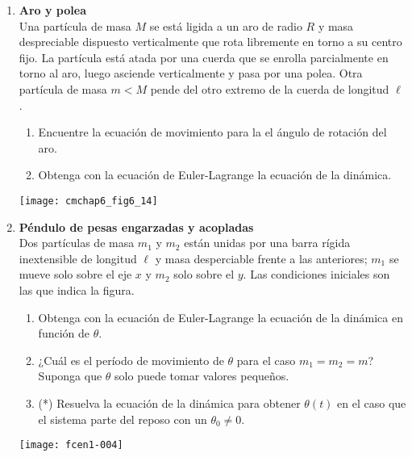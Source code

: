 \documentclass[11pt, spanish, a4paper, twoside]{article}
\begin{document}
\begin{enumerate}
\item 
\begin{minipage}[t][5cm]{0.72\textwidth}
\textbf{Aro y polea}\\
	Una partícula de masa \(M\) se está ligida a un aro de radio \(R\) y masa despreciable dispuesto verticalmente que rota libremente en torno a su centro fijo.
	La partícula está atada por una cuerda que se enrolla parcialmente en torno al aro, luego asciende verticalmente y pasa por una polea.
	Otra partícula de masa \(m < M\) pende del otro extremo de la cuerda de longitud \(\ell\).
	\begin{enumerate}
		\item Encuentre la ecuación de movimiento para la el ángulo de rotación del aro.
		\item Obtenga con la ecuación de Euler-Lagrange la ecuación de la dinámica.
\end{enumerate}
\end{minipage}
\begin{minipage}[c][0cm][t]{0.25\textwidth}
	\texttt{[image: cmchap6\_fig6\_14]}
\end{minipage}


\item 
\begin{minipage}[t][6cm]{0.7\textwidth}
\textbf{Péndulo de pesas engarzadas y acopladas}\\ 
Dos partículas de masa \(m_1\) y \(m_2\) están unidas por una barra rígida inextensible de longitud \(\ell\) y masa desperciable frente a las anteriores; \(m_1\) se mueve solo sobre el eje \(x\) y \(m_2\) solo sobre el \(y\).
Las condiciones iniciales son las que indica la figura.
\begin{enumerate}
	\item Obtenga con la ecuación de Euler-Lagrange la ecuación de la dinámica en función de \(\theta\).
	\item ¿Cuál es el período de movimiento de \(\theta\) para el caso \(m_1 = m_2 = m\)?
	Suponga que \(\theta\) solo puede tomar valores pequeños.
	\item (*) Resuelva la ecuación de la dinámica para obtener \(\theta(t)\) en el caso que el sistema parte del reposo con un \(\theta_0 \neq 0\).
\end{enumerate}
\end{minipage}
\begin{minipage}[c][0cm][t]{0.3\textwidth}
	\texttt{[image: fcen1-004]}
\end{minipage}




\end{enumerate}
\end{document}
